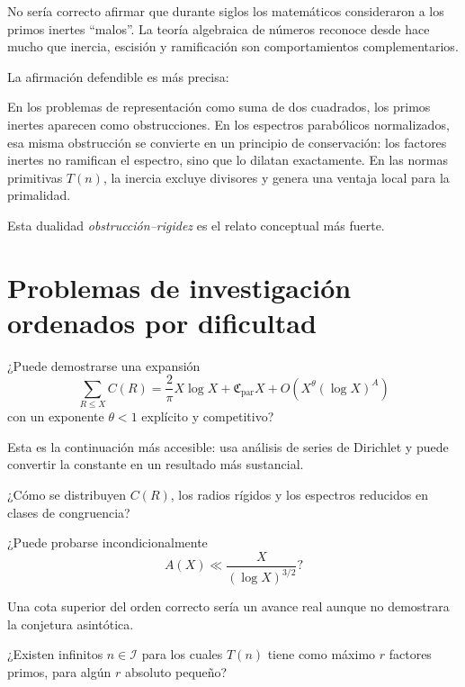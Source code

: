 \documentclass[11pt,a4paper,openany]{report}
\newcommand{\Iset}{\mathcal{I}}
\begin{document}
No sería correcto afirmar que durante siglos los matemáticos consideraron a los primos inertes ``malos''. La teoría algebraica de números reconoce desde hace mucho que inercia, escisión y ramificación son comportamientos complementarios.

La afirmación defendible es más precisa:

\begin{insightbox}
En los problemas de representación como suma de dos cuadrados, los primos inertes aparecen como obstrucciones. En los espectros parabólicos normalizados, esa misma obstrucción se convierte en un principio de conservación: los factores inertes no ramifican el espectro, sino que lo dilatan exactamente. En las normas primitivas \(T(n)\), la inercia excluye divisores y genera una ventaja local para la primalidad.
\end{insightbox}

Esta dualidad \emph{obstrucción--rigidez} es el relato conceptual más fuerte.

\section{Problemas de investigación ordenados por dificultad}

\begin{question}
¿Puede demostrarse una expansión
\[
 \sum_{R\le X}C(R)
 =\frac{2}{\pi}X\log X+\mathfrak C_{\mathrm{par}}X
 +O(X^\theta(\log X)^A)
\]
con un exponente \(\theta<1\) explícito y competitivo?
\end{question}

Esta es la continuación más accesible: usa análisis de series de Dirichlet y puede convertir la constante en un resultado más sustancial.

\begin{question}
¿Cómo se distribuyen \(C(R)\), los radios rígidos y los espectros reducidos en clases de congruencia?
\end{question}

\begin{question}
¿Puede probarse incondicionalmente
\[
 A(X)\ll\frac{X}{(\log X)^{3/2}}?
\]
\end{question}

Una cota superior del orden correcto sería un avance real aunque no demostrara la conjetura asintótica.

\begin{question}
¿Existen infinitos \(n\in\Iset\) para los cuales \(T(n)\) tiene como máximo \(r\) factores primos, para algún \(r\) absoluto pequeño?
\end{question}
\end{document}
